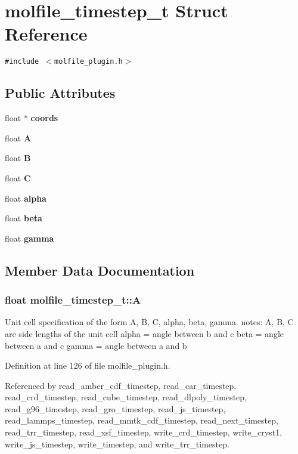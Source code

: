 \section{molfile\_\-timestep\_\-t  Struct Reference}
\label{structmolfile__timestep__t}
{\tt \#include $<$molfile\_\-plugin.h$>$}

\subsection*{Public Attributes}
\begin{CompactItemize}
\item 
float $\ast$ {\bf coords}
\end{CompactItemize}
{\bf }\par
\begin{CompactItemize}
\item 
float {\bf A}
\item 
float {\bf B}
\item 
float {\bf C}
\item 
float {\bf alpha}
\item 
float {\bf beta}
\item 
float {\bf gamma}
\end{CompactItemize}



\subsection{Member Data Documentation}
\subsubsection{\setlength{\rightskip}{0pt plus 5cm}float molfile\_\-timestep\_\-t::A}\label{structmolfile__timestep__t_z4_0}


Unit cell specification of the form A, B, C, alpha, beta, gamma. notes: A, B, C are side lengths of the unit cell alpha = angle between b and c beta = angle between a and c gamma = angle between a and b 

Definition at line 126 of file molfile\_\-plugin.h.

Referenced by read\_\-amber\_\-cdf\_\-timestep, read\_\-car\_\-timestep, read\_\-crd\_\-timestep, read\_\-cube\_\-timestep, read\_\-dlpoly\_\-timestep, read\_\-g96\_\-timestep, read\_\-gro\_\-timestep, read\_\-js\_\-timestep, read\_\-lammps\_\-timestep, read\_\-mmtk\_\-cdf\_\-timestep, read\_\-next\_\-timestep, read\_\-trr\_\-timestep, read\_\-xsf\_\-timestep, write\_\-crd\_\-timestep, write\_\-cryst1, write\_\-js\_\-timestep, write\_\-timestep, and write\_\-trr\_\-timestep.
